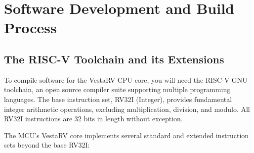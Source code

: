 \documentclass[11pt,pdftex,portrait,letterpaper]{article}
\begin{document}
\section{Software Development and Build Process} \label{s:software}

\subsection{The RISC-V Toolchain and its Extensions}
To compile software for the VestaRV CPU core, you will need the RISC-V GNU toolchain, an open source compiler suite supporting multiple programming languages. The base instruction set, RV32I (Integer), provides fundamental integer arithmetic operations, excluding multiplication, division, and modulo. All RV32I instructions are 32 bits in length without exception.

The \AsicNameForUserGuide{} MCU's VestaRV core implements several standard and extended instruction sets beyond the base RV32I:
\end{document}
